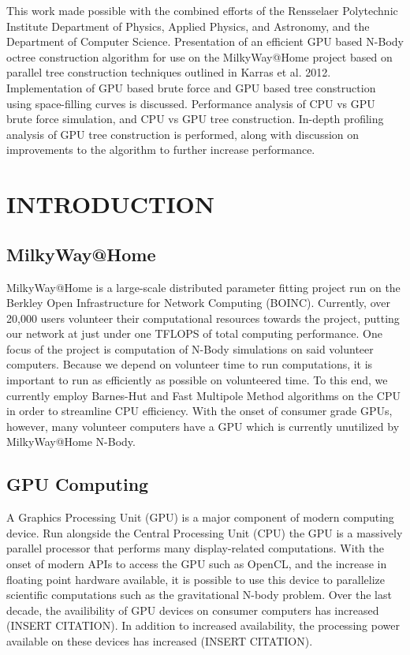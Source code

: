\documentclass{thesis}
\author{Clayton Rayment}
\begin{document}
 
\titlepage             %
\tableofcontents       %
\listoftables          %
\listoffigures         %

This work made possible with the combined efforts of the Rensselaer Polytechnic Institute Department of Physics, Applied Physics, and Astronomy, and the Department of Computer Science.
Presentation of an efficient GPU based N-Body octree construction algorithm for use on the MilkyWay@Home project based on parallel tree construction techniques outlined in Karras et al. 2012. Implementation of GPU based brute force and GPU based tree construction using space-filling curves is discussed. Performance analysis of CPU vs GPU brute force simulation, and CPU vs GPU tree construction. In-depth profiling analysis of GPU tree construction is performed, along with discussion on improvements to the algorithm to further increase performance.
\chapter{INTRODUCTION}
\section{MilkyWay@Home}
MilkyWay@Home is a large-scale distributed parameter fitting project run on the Berkley Open Infrastructure for Network Computing (BOINC). Currently, over 20,000 users volunteer their computational resources towards the project, putting our network at just under one TFLOPS of total computing performance.  One focus of the project is computation of N-Body simulations on said volunteer computers. Because we depend on volunteer time to run computations, it is important to run as efficiently as possible on volunteered time. To this end, we currently employ Barnes-Hut and Fast Multipole Method algorithms on the CPU in order to streamline CPU efficiency. With the onset of consumer grade GPUs, however, many volunteer computers have a GPU which is currently unutilized by MilkyWay@Home N-Body.
\section{GPU Computing}
A Graphics Processing Unit (GPU) is a major component of modern computing device. Run alongside the Central Processing Unit (CPU) the GPU is a massively parallel processor that performs many display-related computations. With the onset of modern APIs to access the GPU such as OpenCL, and the increase in floating point hardware available, it is possible to use this device to parallelize scientific computations such as the gravitational N-body problem. Over the last decade, the availibility of GPU devices on consumer computers has increased (INSERT CITATION). In addition to increased availability, the processing power available on these devices has increased (INSERT CITATION).
\end{document}
